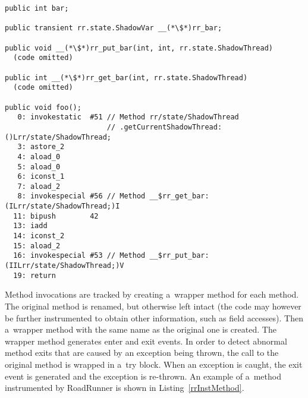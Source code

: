 \begin{lstlisting}[label=rrInstField, float, caption={Code from
Listing~\ref{rrInstBefore} instrumented by RoadRunner. For the \texttt{bar}
field, two access methods are added and a~new field of type \texttt{ShadowVar}.
In the \texttt{foo} method, the \texttt{bar} field is accessed using methods
\texttt{\_\_\$rr\_get\_bar} and \texttt{\_\_\$rr\_put\_bar}. These methods take
the current shadow thread as an argument which is obtained by calling
\texttt{getCurrentShadowThread}.}]
public int bar;

public transient rr.state.ShadowVar __(*\$*)rr_bar;

public void __(*\$*)rr_put_bar(int, int, rr.state.ShadowThread)
  (code omitted)

public int __(*\$*)rr_get_bar(int, rr.state.ShadowThread)
  (code omitted)

public void foo();
   0: invokestatic  #51 // Method rr/state/ShadowThread
                        // .getCurrentShadowThread:()Lrr/state/ShadowThread;
   3: astore_2
   4: aload_0
   5: aload_0
   6: iconst_1
   7: aload_2
   8: invokespecial #56 // Method __$rr_get_bar:(ILrr/state/ShadowThread;)I
  11: bipush        42
  13: iadd
  14: iconst_2
  15: aload_2
  16: invokespecial #53 // Method __$rr_put_bar:(IILrr/state/ShadowThread;)V
  19: return\end{lstlisting}

Method invocations are tracked by creating a~wrapper method for each method. The
original method is renamed, but otherwise left intact (the code may however be
further instrumented to obtain other information, such as field accesses). Then
a~wrapper method with the same name as the original one is created. The wrapper
method generates enter and exit events. In order to detect abnormal method exits
that are caused by an exception being thrown, the call to the original method is
wrapped in a~try block. When an exception is caught, the exit event is generated
and the exception is re-thrown. An example of a~method instrumented by
RoadRunner is shown in Listing~\ref{rrInstMethod}.

